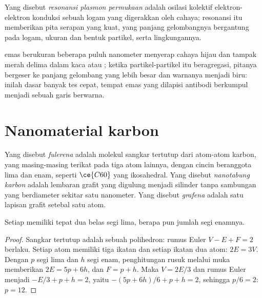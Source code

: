 \begin{definition}\label{def:b3:inorganic-materials:plasmon}
Yang disebut \emph{resonansi plasmon permukaan} adalah
osilasi kolektif elektron-elektron konduksi sebuah  logam yang
digerakkan oleh cahaya; resonansi itu memberikan pita serapan yang kuat, yang panjang gelombangnya bergantung pada
logam, ukuran dan bentuk partikel, serta lingkungannya.
\end{definition}

 emas berukuran beberapa puluh nanometer menyerap cahaya hijau dan tampak
merah delima dalam kaca atau ; ketika partikel-partikel itu beragregasi, pitanya bergeser ke panjang
gelombang yang lebih besar dan warnanya menjadi biru: inilah dasar banyak tes cepat, tempat
 emas yang dilapisi antibodi berkumpul menjadi sebuah garis berwarna.

\section{Nanomaterial karbon}

\begin{definition}\label{def:b3:inorganic-materials:carbon}
Yang disebut \emph{fulerena} adalah molekul sangkar tertutup dari atom-atom karbon,
yang masing-masing terikat pada tiga atom lainnya, dengan cincin beranggota lima dan enam, seperti
$\ce{C60}$ yang ikosahedral. Yang disebut \emph{nanotabung karbon} adalah lembaran
grafit yang digulung menjadi silinder tanpa sambungan yang berdiameter sekitar satu nanometer.
Yang disebut \emph{grafena} adalah satu lapisan grafit setebal satu atom.
\end{definition}

\begin{proposition}\label{prop:b3:inorganic-materials:euler}
Setiap  memiliki tepat dua belas segi lima, berapa pun jumlah
segi enamnya.
\end{proposition}

\begin{proof}
Sangkar tertutup adalah sebuah polihedron: rumus Euler $V - E + F = 2$ berlaku. Setiap atom memiliki
tiga ikatan dan setiap ikatan dua atom: $2E = 3V$. Dengan $p$ segi lima dan $h$ segi enam,
penghitungan rusuk melalui muka memberikan $2E = 5p + 6h$, dan $F = p + h$. Maka $V = 2E/3$ dan rumus
Euler menjadi $-E/3 + p + h = 2$, yaitu $-(5p + 6h)/6 + p + h = 2$, sehingga $p/6 = 2$: $p = 12$.
\end{proof}

